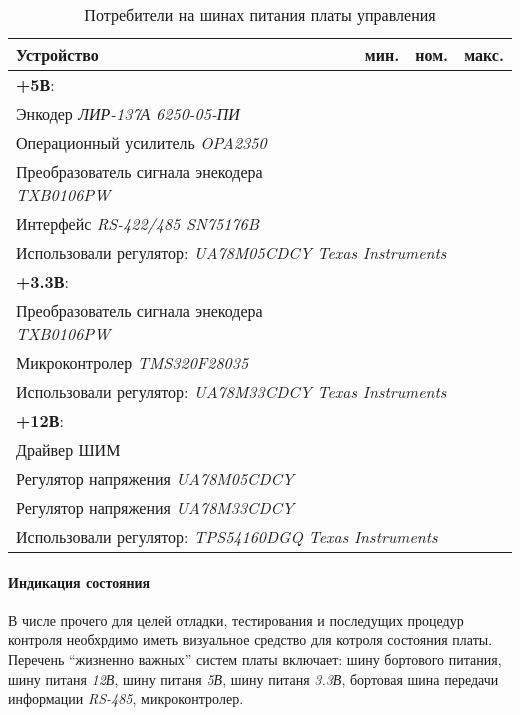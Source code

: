 \begin{table}[ht!]
    \centering
    \begin{tabular}{|l|c|c|c|}
        \hline
        Устройство & мин. & ном. & макс. \\
        \hline \hline
        \textbf{+5В}: &&& \\
        Энкодер \textit{ЛИР-137А 6250-05-ПИ} &&& \\
        Операционный усилитель \textit{OPA2350} &&& \\
        Преобразователь сигнала энекодера \textit{TXB0106PW} &&& \\
        Интерфейс \textit{RS-422/485 SN75176B} &&& \\
        \hline
        \multicolumn{4}{|l|}{
            Использовали регулятор:
            \textit{UA78M05CDCY Texas Instruments}
        } \\

        \hline \hline
        \textbf{+3.3В}: &&& \\
        Преобразователь сигнала энекодера \textit{TXB0106PW} &&& \\
        Микроконтролер \textit{TMS320F28035} &&& \\
        \hline
        \multicolumn{4}{|l|}{
            Использовали регулятор:
            \textit{UA78M33CDCY Texas Instruments}
        } \\

        \hline \hline
        \textbf{+12В}: &&& \\
        Драйвер ШИМ &&& \\
        Регулятор напряжения \textit{UA78M05CDCY} &&& \\
        Регулятор напряжения \textit{UA78M33CDCY} &&& \\

        \hline
        \multicolumn{4}{|l|}{
            Использовали регулятор:
            \textit{TPS54160DGQ Texas Instruments}
        } \\

        \hline
    \end{tabular}
    \caption{Потребители на шинах питания платы управления}
    \label{powerConsumersOnBoard}
\end{table}

\paragraph{Индикация состояния}
В числе прочего для целей отладки, тестирования и последущих процедур контроля
необхрдимо иметь визуальное средство для котроля состояния платы.
Перечень ``жизненно важных'' систем платы включает:
шину бортового питания,
шину питаня \textit{12В},
шину питаня \textit{5В},
шину питаня \textit{3.3В},
бортовая шина передачи информации \textit{RS-485},
микроконтролер.

